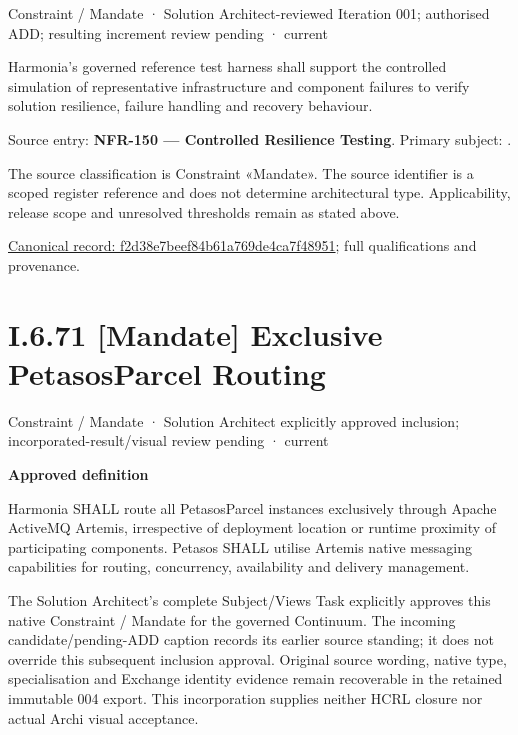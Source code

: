 \label{element:f2d38e7beef84b61a769de4ca7f48951}
{\small Constraint / Mandate · Solution Architect-reviewed Iteration 001; authorised ADD; resulting increment review pending · current}\par

Harmonia's governed reference test harness shall support the controlled simulation of representative infrastructure and component failures to verify solution resilience, failure handling and recovery behaviour.



Source entry: \textbf{NFR-150 — Controlled Resilience Testing}. Primary subject: \texttt{}.



The source classification is Constraint «Mandate». The source identifier is a scoped register reference and does not determine architectural type. Applicability, release scope and unresolved thresholds remain as stated above.


{\footnotesize \href{../../../../continuum/motivation/constraint/mandate/f2d38e7beef84b61a769de4ca7f48951.md}{Canonical record: f2d38e7beef84b61a769de4ca7f48951}; full qualifications and provenance.}\par
\section*{I.6.71 [Mandate] Exclusive PetasosParcel Routing}
\label{navigation:I.6.71}

\label{element:e024703b32c5437481ce290e8e50b079}
{\small Constraint / Mandate · Solution Architect explicitly approved inclusion; incorporated-result/visual review pending · current}\par

\par\medskip\textbf{Approved definition}\par


Harmonia SHALL route all PetasosParcel instances exclusively through Apache ActiveMQ Artemis, irrespective of deployment location or runtime proximity of participating components. Petasos SHALL utilise Artemis native messaging capabilities for routing, concurrency, availability and delivery management.



The Solution Architect's complete Subject/Views Task explicitly approves this
native Constraint / Mandate for the governed Continuum.
The incoming candidate/pending-ADD caption records its earlier source standing;
it does not override this subsequent inclusion approval. Original source wording,
native type, specialisation and Exchange identity evidence remain recoverable in
the retained immutable 004 export. This incorporation supplies neither HCRL closure
nor actual Archi visual acceptance.



